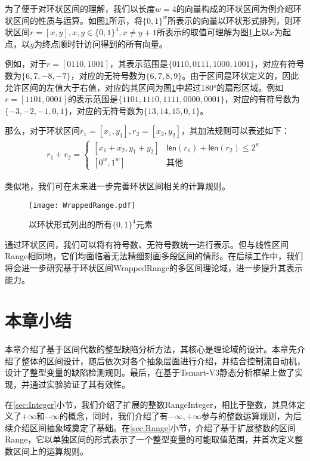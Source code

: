 为了便于对环状区间的理解，我们以长度$ w = 4$的向量构成的环状区间为例介绍环状区间的性质与运算。如图\ref{fig:wrappedRange}所示，将$ \{0, 1\}^w $所表示的向量以环状形式排列，则环状区间$ r = [x, y], x, y\in \{0, 1\}^4, x \ne y + 1 $所表示的取值可理解为图\ref{fig:wrappedRange}上以$ x $为起点，以$ y $为终点顺时针访问得到的所有向量。

例如，对于$ r = [0110, 1001] $，其表示范围是$ \{0110, 0111, 1000, 1001\} $，对应有符号数为$ \{6, 7, -8, -7\} $，对应的无符号数为$ \{6, 7, 8, 9\} $。由于区间是环状定义的，因此允许区间的左值大于右值，对应的其区间为图\ref{fig:wrappedRange}中超过180°的扇形区域。例如$ r = [1101, 0001] $的表示范围是$ \{1101, 1110, 1111, 0000, 0001 \} $，对应的有符号数为$ \{-3, -2, -1, 0, 1\} $，对应的无符号数为$ \{13, 14, 15, 0, 1\} $。

那么，对于环状区间$ r_1 = [x_1, y_1], r_2 = [x_2, y_2] $，其加法规则可以表述如下：
\begin{align}
	r_1 + r_2 = \begin{cases}
	[x_1 + x_2, y_1 + y_2] & \mathsf{len}(r_1) + \mathsf{len}(r_2) \le 2^w\\
	[0^w, 1^w] & \text{其他}
	\end{cases}
\end{align}

类似地，我们可在未来进一步完善环状区间相关的计算规则。

\begin{figure}[htb]
	\centering
	\texttt{[image: WrappedRange.pdf]}
	\caption{以环状形式列出的所有$ \{0, 1\}^4 $元素}
	\label{fig:wrappedRange}
\end{figure}

通过环状区间，我们可以将有符号数、无符号数统一进行表示。但与线性区间Range相同地，它们均面临着无法精细刻画多段区间的情形。在后续工作中，我们将会进一步研究基于环状区间WrappedRange的多区间理论域，进一步提升其表示能力。

\section{本章小结}

本章介绍了基于区间代数的整型缺陷分析方法，其核心是理论域的设计。本章先介绍了整体的区间设计，随后依次对各个抽象层面进行介绍，并结合控制流自动机，设计了整型变量的缺陷检测规则。最后，在基于Tsmart-V3静态分析框架上做了实现，并通过实验验证了其有效性。

在\ref{sec:Integer}小节，我们介绍了扩展的整数RangeInteger，相比于整数，其具体定义了$ +\infty $和$ -\infty $的概念，同时，我们介绍了有$ -\infty, +\infty $参与的整数运算规则，为后续介绍区间抽象域奠定了基础。在\ref{sec:Range}小节，介绍了基于扩展整数的区间Range，它以单独区间的形式表示了一个整型变量的可能取值范围，并首次定义整数区间上的运算规则。


